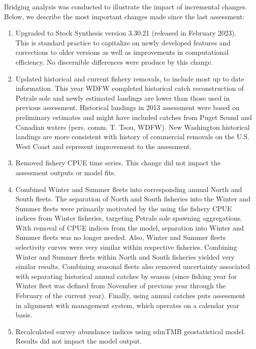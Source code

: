 \documentclass[
]{scrartcl}
\begin{document}
Bridging analysis was conducted to illustrate the impact of incremental
changes. Below, we describe the most important changes made since the
last assessment:

\begin{enumerate}

\item Upgraded to Stock Synthesis version 3.30.21 (released in February 2023). This is standard practice to capitalize on newly developed features and corrections to older versions as well as improvements in computational efficiency.  No discernible differences were produce by this change.

\item Updated historical and current fishery removals, to include most up to date information. This year WDFW completed historical catch reconstruction of Petrale sole and newly estimated landings are lower than those used in previous assessment. Historical landings in 2013 assessment were based on preliminary estimates and might have included catches from Puget Sound and Canadian waters (pers. comm. T. Tsou, WDFW). New Washington historical landings are more consistent with history of commercial removals on the U.S. West Coast and represent improvement to the assessment.

\item Removed fishery CPUE time series. This change did not impact the assessment outputs or model fits.

\item Combined Winter and Summer fleets into corresponding annual North and South fleets. The separation of North and South fisheries into the Winter and Summer fleets were primarily motivated by the using the fishery CPUE indices from Winter fisheries, targeting Petrale sole spawning aggregations. With removal of CPUE indices from the model, separation into Winter and Summer fleets was no longer needed. Also, Winter and Summer fleets selectivity curves were very similar within respective fisheries. Combining Winter and Summer fleets within North and South fisheries yielded very similar results. Combining seasonal fleets also removed uncertainty associated with separating historical annual catches by season (since fishing year for Winter fleet was defined from November of previous year through the February of the current year). Finally, using annual catches puts assessment in alignment with management system, which operates on a calendar year basis.

\item Recalculated survey abundance indices using sdmTMB geostatistical model. Results did not impact the model output.


\end{enumerate}
\end{document}
